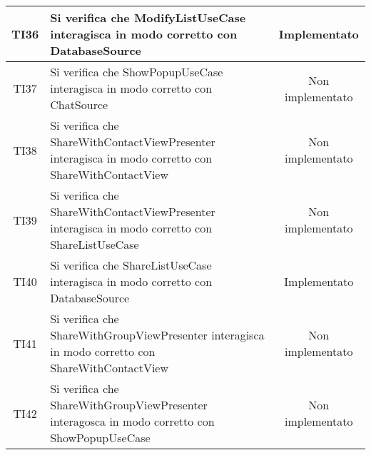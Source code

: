 \begin{center}
\begin{longtable}{|c|>{\centering}m{10cm}|c|}
		TI36 & Si verifica che ModifyListUseCase interagisca in modo corretto con DatabaseSource & Implementato \\ \hline
		TI37 & Si verifica che ShowPopupUseCase interagisca in modo corretto con ChatSource & Non implementato \\ \hline
		TI38 & Si verifica che ShareWithContactViewPresenter interagisca in modo corretto con ShareWithContactView & Non implementato \\ \hline
		TI39 & Si verifica che ShareWithContactViewPresenter interagisca in modo corretto con ShareListUseCase & Non implementato \\ \hline
		TI40 & Si verifica che ShareListUseCase interagisca in modo corretto con DatabaseSource & Implementato \\ \hline
		TI41 & Si verifica che ShareWithGroupViewPresenter interagisca in modo corretto con ShareWithContactView & Non implementato \\ \hline
		TI42 & Si verifica che ShareWithGroupViewPresenter interagosca in modo corretto con ShowPopupUseCase & Non implementato \\ \hline
	\end{longtable}
\end{center}
